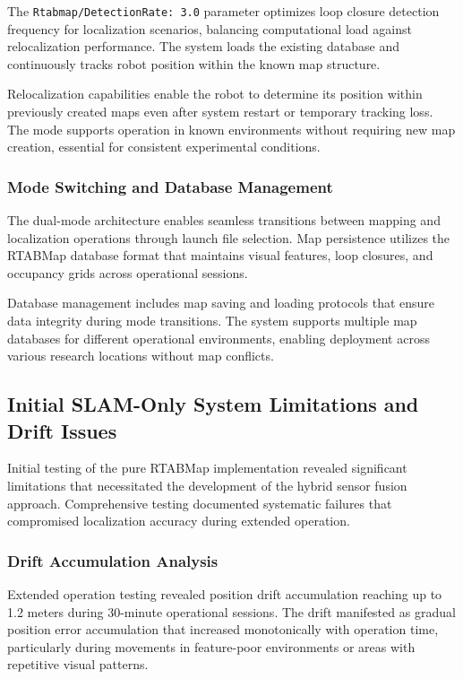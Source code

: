 The \texttt{Rtabmap/DetectionRate: 3.0} parameter optimizes loop closure detection frequency for localization scenarios, balancing computational load against relocalization performance. The system loads the existing database and continuously tracks robot position within the known map structure.

Relocalization capabilities enable the robot to determine its position within previously created maps even after system restart or temporary tracking loss. The mode supports operation in known environments without requiring new map creation, essential for consistent experimental conditions.

\subsubsection{Mode Switching and Database Management}

The dual-mode architecture enables seamless transitions between mapping and localization operations through launch file selection. Map persistence utilizes the RTABMap database format that maintains visual features, loop closures, and occupancy grids across operational sessions.

Database management includes map saving and loading protocols that ensure data integrity during mode transitions. The system supports multiple map databases for different operational environments, enabling deployment across various research locations without map conflicts.

\subsection{Initial SLAM-Only System Limitations and Drift Issues}

Initial testing of the pure RTABMap implementation revealed significant limitations that necessitated the development of the hybrid sensor fusion approach. Comprehensive testing documented systematic failures that compromised localization accuracy during extended operation.

\subsubsection{Drift Accumulation Analysis}

Extended operation testing revealed position drift accumulation reaching up to 1.2 meters during 30-minute operational sessions. The drift manifested as gradual position error accumulation that increased monotonically with operation time, particularly during movements in feature-poor environments or areas with repetitive visual patterns.

